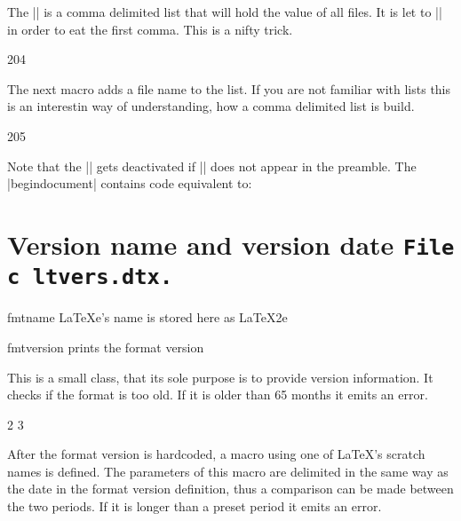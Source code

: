 The |\@filelist| is a comma delimited list that will hold the value of all files. It is let to |\@gobble| in order to eat the first comma. This is a nifty trick. 

\begin{teX}
204 \let\@filelist\@gobble
\end{teX}

The next macro adds a file name to the list. If you are not familiar with lists this is an interestin way of understanding, how a comma delimited list is build.

\begin{teXXX}
205 \def\@addtofilelist#1{\xdef\@filelist{\@filelist,#1}}
\end{teXXX}

Note that the |\@filelist| gets deactivated if |\listfiles| does not appear in the preamble. The |begin{document}|
contains code equivalent to:

\begin{teXXX}
\AtBeginDocument{%
  \ifx\@listfiles\@undefined
  \let\@filelist\relax
  \let\@addtofilelist\@gobble
\fi}
\@onlypreamble\listfiles
\let\@dofilelist\relax
\end{teXXX} 



\section{Version name and version date \texttt{File c ltvers.dtx.}}

\begin{docCommand}{fmtname}{}
LaTeXe's name is stored here as LaTeX2e
\end{docCommand}

\begin{docCommand}{fmtversion}{}
prints the format version
\end{docCommand}

This is a small class,  that its sole purpose is to provide version information. It checks
if the format is too old. If it is older than 65 months it emits an error. 

\begin{teXXX}
2 \def\fmtname{LaTeX2e}
3 \edef\fmtversion{2011/06/27}
\end{teXXX}

After the format version is hardcoded, a macro using one of LaTeX's scratch names is defined. The parameters
of this macro are delimited in the same way as the date in the format version definition, thus a comparison can be made between the two periods. If it is longer than a preset period it emits an error.

